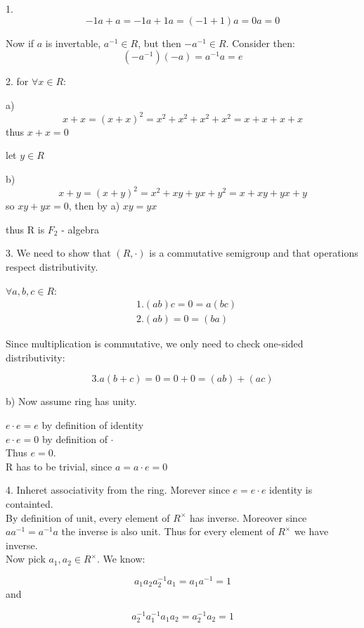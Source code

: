 \documentclass{amsart}
\author{M. Tikhonov}
\begin{document}
1. 
$$ -1a + a = -1a + 1a = (-1 + 1) a = 0a = 0$$

Now if $a$ is invertable, $a^{-1} \in R$, but then $-a^{-1} \in R$. Consider then:
$$(-a ^{-1}) (-a) = a^{-1} a = e$$

2. 
for $\forall x \in R$:

a)$$ x + x = (x+x)^2 = x^2 + x^2 + x^2 + x^2 = x + x + x + x$$
thus $x+x=0$

let $y \in R$


b) $$ x + y = (x+y)^2 = x^2 + xy + yx + y^2 = x + xy + yx + y$$
so 
$xy + yx = 0$, then by a) $xy = yx$

thus R is $F_2$ - algebra 

3. We need to show that $(R, \cdot)$ is a commutative semigroup and that operations respect distributivity.

$\forall a,b,c \in R$:\\

\begin{align*}
    &1. (ab) c = 0 = a (bc)\\
    &2. (ab) = 0 = (ba) 
\end{align*}


Since multiplication is commutative, we only need to check one-sided distributivity:

$$3. a (b+c) = 0 = 0 + 0 = (ab) + (ac)$$

b) Now assume ring has unity.

$e \cdot e = e$ by definition of identity \\

$e \cdot e = 0$ by definition of $\cdot$ \\

Thus $e = 0$.\\

R has to be trivial, since $a = a \cdot e = 0$

4. Inheret associativity from the ring. Morever since $e=e \cdot e$ identity is containted.\\

By definition of unit, every element of $R^{\times}$ has inverse. Moreover since $a a^{-1} = a^{-1} a$ the inverse is also unit. Thus for every element of $R^{\times}$ we have inverse.\\

Now pick $a_1, a_2 \in R^{\times}$. We know:

$$a_1 a_2 a_2^{-1} a_1 = a_1 a^{-1} = 1$$
and

$$a_2^{-1} a_1^{-1} a_1 a_2 = a_2^{-1} a_2 = 1$$
\end{document}

